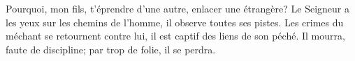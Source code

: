 Pourquoi, mon fils, t’éprendre d’une autre,
	enlacer une étrangère?
Le Seigneur a les yeux sur les chemins de l’homme,
	il observe toutes ses pistes.
Les crimes du méchant se retournent contre lui,
	il est captif des liens de son péché.
	Il mourra, faute de discipline; par trop de folie, il se perdra.
